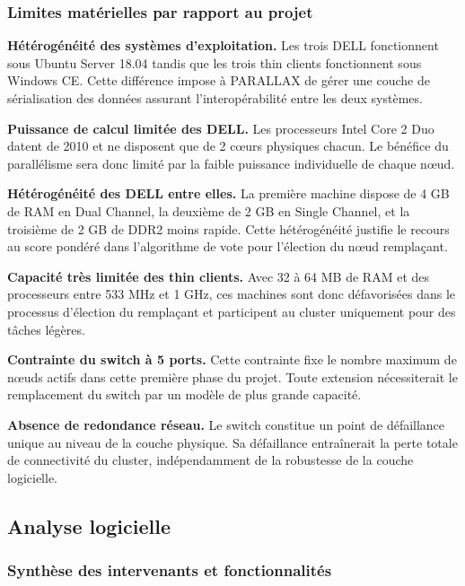 \documentclass[12pt,a4paper]{report}
\theoremstyle{definition}
\begin{document}
\subsubsection{Limites matérielles par rapport au projet}

\textbf{Hétérogénéité des systèmes d'exploitation.} Les trois DELL fonctionnent sous Ubuntu Server 18.04 tandis que les trois thin clients fonctionnent sous Windows CE. Cette différence impose à PARALLAX de gérer une couche de sérialisation des données assurant l'interopérabilité entre les deux systèmes.

\textbf{Puissance de calcul limitée des DELL.} Les processeurs Intel Core 2 Duo datent de 2010 et ne disposent que de 2 cœurs physiques chacun. Le bénéfice du parallélisme sera donc limité par la faible puissance individuelle de chaque nœud.

\textbf{Hétérogénéité des DELL entre elles.} La première machine dispose de 4 GB de RAM en Dual Channel, la deuxième de 2 GB en Single Channel, et la troisième de 2 GB de DDR2 moins rapide. Cette hétérogénéité justifie le recours au score pondéré dans l'algorithme de vote pour l'élection du nœud remplaçant.

\textbf{Capacité très limitée des thin clients.} Avec 32 à 64 MB de RAM et des processeurs entre 533 MHz et 1 GHz, ces machines sont donc défavorisées dans le processus d'élection du remplaçant et participent au cluster uniquement pour des tâches légères.

\textbf{Contrainte du switch à 5 ports.} Cette contrainte fixe le nombre maximum de nœuds actifs dans cette première phase du projet. Toute extension nécessiterait le remplacement du switch par un modèle de plus grande capacité.

\textbf{Absence de redondance réseau.} Le switch constitue un point de défaillance unique au niveau de la couche physique. Sa défaillance entraînerait la perte totale de connectivité du cluster, indépendamment de la robustesse de la couche logicielle.

\subsection{Analyse logicielle}

\subsubsection{ Synthèse des intervenants et fonctionnalités}
\end{document}
